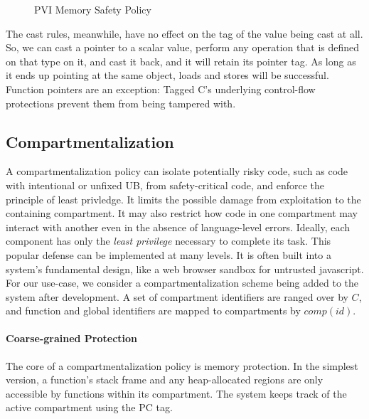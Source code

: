 \documentclass{llncs}
\begin{document}
\begin{table}[t]
\begin{figure}
  \caption{PVI Memory Safety Policy}
  \label{fig:pvi}
\end{figure}

The cast rules, meanwhile, have no effect on the tag of the value being cast at all. So,
we can cast a pointer to a scalar value, perform any operation that is defined on that type
on it, and cast it back, and it will retain its pointer tag. As long as it ends up pointing
at the same object, loads and stores will be successful. Function pointers are an exception:
Tagged C's underlying control-flow protections prevent them from being tampered with.

\subsection{Compartmentalization}
\label{sec:comp}

A compartmentalization policy can isolate potentially risky code, such as code with intentional
or unfixed UB, from safety-critical code, and enforce the principle of least privledge. 
It limits the possible damage from exploitation to the containing compartment.
It may also restrict how code in one compartment may interact with another
even in the absence of language-level errors. Ideally, each component has only the
{\em least privilege} necessary to complete its task.
This popular defense can be implemented at many levels. It is often built
into a system's fundamental design, like a web browser sandbox for untrusted javascript.
For our use-case, we consider a compartmentalization scheme being added to the system
after development. A set of compartment identifiers are ranged over by \(C\),
and function and global identifiers are mapped to compartments by \(\mathit{comp}(id)\). 

\paragraph{Coarse-grained Protection}

%
The core of a compartmentalization policy is memory protection. In the simplest version, 
a function's stack frame and any heap-allocated regions are only accessible by functions within its
compartment. The system keeps track of the active compartment using the PC tag.


\end{table}
\end{document}
